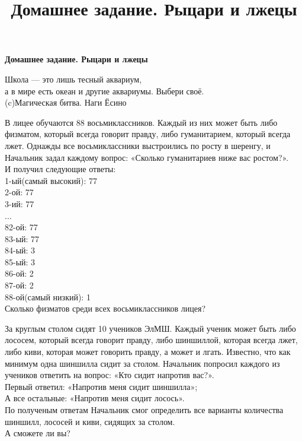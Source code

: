 \centerline{\bf \Huge Домашнее задание. Рыцари и лжецы}
\title{Домашнее задание. Рыцари и лжецы}

\begin{flushright}
        \scriptsize{Школа — это лишь тесный аквариум, \\а в мире есть океан и другие аквариумы. Выбери своё. \\ (c)Магическая битва. Наги Ёсино}
\end{flushright}

 В лицее обучаются 88 восьмиклассников. Каждый из них может быть либо физматом, который всегда говорит правду, либо гуманитарием, который всегда лжет. Однажды все восьмиклассники выстроились по росту в шеренгу, и Начальник задал каждому вопрос: «Сколько гуманитариев ниже вас ростом?».\\
И получил следующие ответы:\\
1-ый(самый высокий): 77\\
2-ой: 77\\
3-ий: 77\\
$\dotsc$\\
82-ой: 77\\
83-ый: 77\\
84-ый: 3\\
85-ый: 3\\
86-ой: 2\\
87-ой: 2\\
88-ой(самый низкий): 1\\
Сколько физматов среди всех восьмиклассников лицея? 

За круглым столом сидят 10 учеников ЭлМШ. Каждый ученик может быть либо лососем, который всегда говорит правду, либо шиншиллой, которая всегда лжет, либо киви, которая может говорить правду, а может и лгать. Известно, что как минимум одна шиншилла сидит за столом. Начальник попросил каждого из учеников ответить на вопрос: «Кто сидит напротив вас?».\\
Первый ответил: «Напротив меня сидит шиншилла»;\\
А все остальные: «Напротив меня сидит лосось».\\
По полученым ответам Начальник смог определить все варианты количества шиншилл, лососей и киви, сидящих за столом.\\
А сможете ли вы?